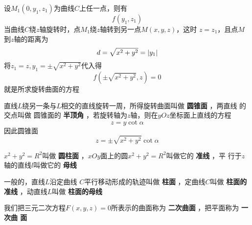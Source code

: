 \documentclass[11pt]{article}
\begin{document}
设\(M_1(0,y_1,z_1)\)为曲线\(C\)上任一点，则有
\begin{equation*}
f(y_1,z_1)
\end{equation*}
当曲线\(C\)绕\(z\)轴旋转时，点\(M_1\)绕\(z\)轴转到另一点\(M(x,y,z)\)，这时
\(z=z_1\)，且点\(M\)到\(z\)轴的距离为
\begin{equation*}
d=\sqrt{x^2+y^2}=\abs{y_1}
\end{equation*}
将\(z_1=z,y_1=\pm\sqrt{x^2+y^2}\)代入得
\begin{equation*}
f(\pm\sqrt{x^2+y^2},z)=0
\end{equation*}
就是所求旋转曲面的方程

\begin{examplle}[]
直线\(L\)绕另一条与\(L\)相交的直线旋转一周，所得旋转曲面叫做 \textbf{圆锥面} ，两直线
的交点叫做 圆锥面的 \textbf{半顶角} ，若旋转轴为\(z\)轴，则在\(yOz\)坐标面上直线的方程
\begin{equation*}
z=y\cot\alpha
\end{equation*}
因此圆锥面
\begin{equation*}
z=\pm\sqrt{x^2+y^2}\cot\alpha
\end{equation*}
\end{examplle}

\(x^2+y^2=R^2\)叫做 \textbf{圆柱面} ，\(xOy\)面上的圆\(x^2+y^2=R^2\)叫做它的 \textbf{准线} ，平
行于\(z\)轴的直线\(l\)叫做它的 \textbf{母线}

一般的，直线\(L\)沿定曲线 \(C\)平行移动形成的轨迹叫做 \textbf{柱面} ，定曲线\(C\)叫做
\textbf{柱面的准线} ，动直线\(L\)叫做 \textbf{柱面的母线}

我们把三元二次方程\(F(x,y,z)=0\)所表示的曲面称为 \textbf{二次曲面} ，把平面称为 \textbf{一次曲
面}
\end{document}
